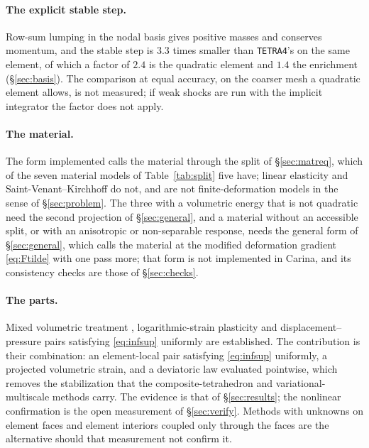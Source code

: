 \documentclass[11pt]{article}
\newcommand{\code}[1]{\texttt{#1}}
\theoremstyle{definition}
\theoremstyle{plain}
\begin{document}
\paragraph{The explicit stable step.} Row-sum lumping in the nodal basis gives
positive masses and conserves momentum, and the stable step is $3.3$ times
smaller than \code{TETRA4}'s on the same element, of which a factor of $2.4$
is the quadratic element and $1.4$ the enrichment (\S\ref{sec:basis}). The comparison at equal accuracy, on the coarser mesh a
quadratic element allows, is not measured; if weak shocks are run with the
implicit integrator the factor does not apply.

\paragraph{The material.} The form implemented calls the material through
the split of \S\ref{sec:matreq}, which of the seven material models of
Table~\ref{tab:split} five have; linear elasticity and
Saint-Venant--Kirchhoff do not, and are not finite-deformation models in
the sense of \S\ref{sec:problem}. The three with a volumetric energy that
is not quadratic need the second projection of \S\ref{sec:general}, and a
material without an accessible split, or with an anisotropic or
non-separable response, needs the general form of \S\ref{sec:general},
which calls the material at the modified deformation gradient
\eqref{eq:Ftilde} with one pass more; that form is not implemented in
Carina, and its consistency checks are those of \S\ref{sec:checks}.

\paragraph{The parts.} Mixed volumetric treatment
\citep{SimoTaylorPister:1985}, logarithmic-strain plasticity
\citep{Miehe.Apel.Lambrecht:2002} and displacement--pressure pairs satisfying
\eqref{eq:infsup} uniformly \citep{BoffiBrezziFortin:2013} are established.
The contribution is their combination: an element-local pair satisfying
\eqref{eq:infsup} uniformly, a projected volumetric strain, and a deviatoric
law evaluated pointwise, which removes the stabilization that the
composite-tetrahedron and variational-multiscale methods carry. The evidence
is that of \S\ref{sec:results}; the nonlinear confirmation is the open
measurement of \S\ref{sec:verify}. Methods with unknowns on element faces and
element interiors coupled only through the faces \citep{AbbasErnPignet:2019}
are the alternative should that measurement not confirm it.



\end{document}
